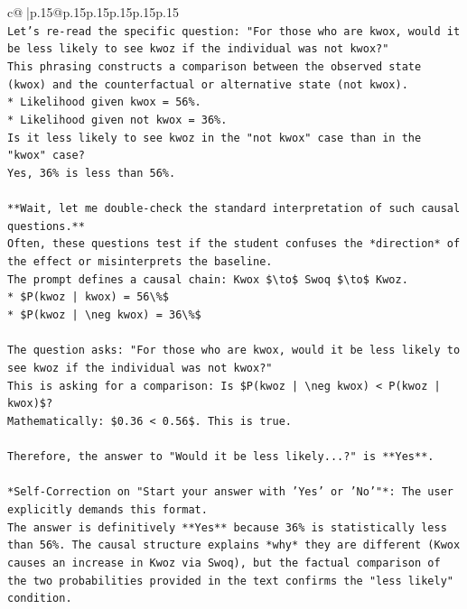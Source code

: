 \documentclass{article}
\begin{document}
{\begin{supertabular}{c@{$\;$}|p{.15\linewidth}@{}p{.15\linewidth}p{.15\linewidth}p{.15\linewidth}p{.15\linewidth}p{.15\linewidth}}
{{{\\ 
\texttt{Let's re{-}read the specific question: "For those who are kwox, would it be less likely to see kwoz if the individual was not kwox?"} \\
\texttt{This phrasing constructs a comparison between the observed state (kwox) and the counterfactual or alternative state (not kwox).} \\
\texttt{*   Likelihood given kwox = 56\%.} \\
\texttt{*   Likelihood given not kwox = 36\%.} \\
\texttt{Is it less likely to see kwoz in the "not kwox" case than in the "kwox" case?} \\
\texttt{Yes, 36\% is less than 56\%.} \\
\\ 
\texttt{**Wait, let me double{-}check the standard interpretation of such causal questions.**} \\
\texttt{Often, these questions test if the student confuses the *direction* of the effect or misinterprets the baseline.} \\
\texttt{The prompt defines a causal chain: Kwox \$\textbackslash{}to\$ Swoq \$\textbackslash{}to\$ Kwoz.} \\
\texttt{*   \$P(kwoz | kwox) = 56\textbackslash{}\%\$} \\
\texttt{*   \$P(kwoz | \textbackslash{}neg kwox) = 36\textbackslash{}\%\$} \\
\\ 
\texttt{The question asks: "For those who are kwox, would it be less likely to see kwoz if the individual was not kwox?"} \\
\texttt{This is asking for a comparison: Is \$P(kwoz | \textbackslash{}neg kwox) < P(kwoz | kwox)\$?} \\
\texttt{Mathematically: \$0.36 < 0.56\$. This is true.} \\
\\ 
\texttt{Therefore, the answer to "Would it be less likely...?" is **Yes**.} \\
\\ 
\texttt{*Self{-}Correction on "Start your answer with 'Yes' or 'No'"*: The user explicitly demands this format.} \\
\texttt{The answer is definitively **Yes** because 36\% is statistically less than 56\%. The causal structure explains *why* they are different (Kwox causes an increase in Kwoz via Swoq), but the factual comparison of the two probabilities provided in the text confirms the "less likely" condition.} \\
}}}
\end{supertabular}}
\end{document}
